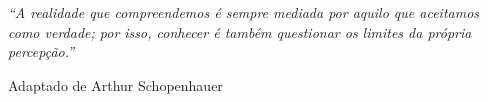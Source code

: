 ﻿%
\newpage
\thispagestyle{empty}
\vspace*{\fill}
\begin{flushright}
	\begin{minipage}{0.6\textwidth}
		\normalsize\itshape
		``A realidade que compreendemos é sempre mediada por aquilo que aceitamos como verdade; por isso, conhecer é também questionar os limites da própria percepção.''

		\vspace{0.3cm}
		\normalfont\hfill Adaptado de Arthur Schopenhauer
	\end{minipage}
\end{flushright}